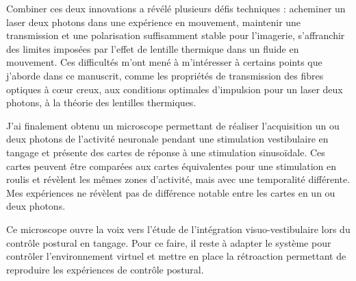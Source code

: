 Combiner ces deux innovations a révélé plusieurs défis techniques : acheminer un laser deux photons dans une expérience en mouvement, maintenir une transmission et une polarisation suffisamment stable pour l'imagerie, s'affranchir des limites imposées par l'effet de lentille thermique dans un fluide en mouvement. Ces difficultés m'ont mené à m'intéresser à certains points que j'aborde dans ce manuscrit, comme les propriétés de transmission des fibres optiques à cœur creux, aux conditions optimales d'impulsion pour un laser deux photons, à la théorie des lentilles thermiques. 

J'ai finalement obtenu un microscope permettant de réaliser l'acquisition un ou deux photons de l'activité neuronale pendant une stimulation vestibulaire en tangage et présente des cartes de réponse à une stimulation sinusoïdale. Ces cartes peuvent être comparées aux cartes équivalentes pour une stimulation en roulis et révèlent les mêmes zones d'activité, mais avec une temporalité différente. Mes expériences ne révèlent pas de différence notable entre les cartes en un ou deux photons.

Ce microscope ouvre la voix vers l'étude de l'intégration visuo-vestibulaire lors du contrôle postural en tangage. Pour ce faire, il reste à adapter le système pour contrôler l'environnement virtuel et mettre en place la rétroaction permettant de reproduire les expériences de contrôle postural.